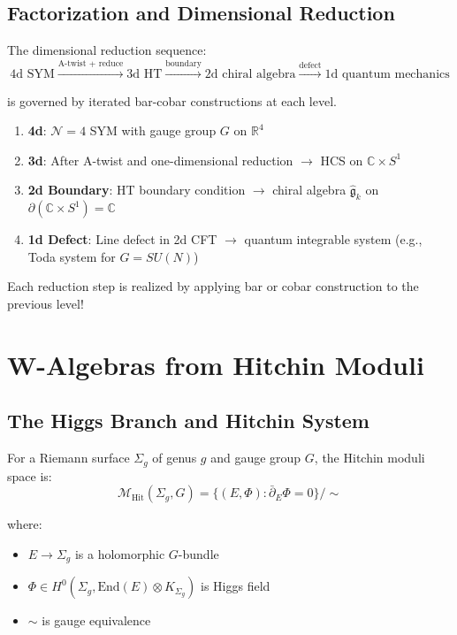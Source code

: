 \subsection{Factorization and Dimensional Reduction}

\begin{theorem}
The dimensional reduction sequence:
$$\text{4d SYM} \xrightarrow{\text{A-twist + reduce}} 
\text{3d HT} \xrightarrow{\text{boundary}} 
\text{2d chiral algebra} \xrightarrow{\text{defect}} 
\text{1d quantum mechanics}$$

is governed by iterated bar-cobar constructions at each level.
\end{theorem}

\begin{example}[Explicit Tower for $\mathcal{N}=4$ SYM]
\begin{enumerate}
\item \textbf{4d}: $\mathcal{N}=4$ SYM with gauge group $G$ on $\mathbb{R}^4$

\item \textbf{3d}: After A-twist and one-dimensional reduction $\to$ HCS on 
$\mathbb{C} \times S^1$

\item \textbf{2d Boundary}: HT boundary condition $\to$ chiral algebra 
$\widehat{\mathfrak{g}}_k$ on $\partial(\mathbb{C} \times S^1) = \mathbb{C}$

\item \textbf{1d Defect}: Line defect in 2d CFT $\to$ quantum integrable system 
(e.g., Toda system for $G = SU(N)$)
\end{enumerate}

Each reduction step is realized by applying bar or cobar construction to the 
previous level!
\end{example}

\section{W-Algebras from Hitchin Moduli}

\subsection{The Higgs Branch and Hitchin System}

\begin{definition}
For a Riemann surface $\Sigma_g$ of genus $g$ and gauge group $G$, the Hitchin 
moduli space is:
$$\mathcal{M}_{\text{Hit}}(\Sigma_g, G) = \{(E, \Phi) : \bar{\partial}_E \Phi = 0\} / 
\sim$$

where:
\begin{itemize}
\item $E \to \Sigma_g$ is a holomorphic $G$-bundle
\item $\Phi \in H^0(\Sigma_g, \text{End}(E) \otimes K_{\Sigma_g})$ is Higgs field
\item $\sim$ is gauge equivalence
\end{itemize}
\end{definition}

